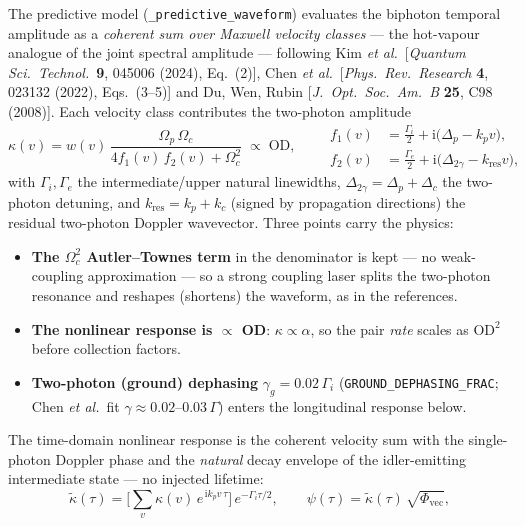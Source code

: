 \documentclass[11pt]{article}
\newcommand{\ii}{\mathrm{i}}
\newcommand{\code}[1]{\texttt{#1}}
\begin{document}
The predictive model (\code{\_predictive\_waveform}) evaluates the biphoton
temporal amplitude as a \emph{coherent sum over Maxwell velocity classes} --- the
hot-vapour analogue of the joint spectral amplitude --- following Kim
\emph{et al.}\ [\emph{Quantum Sci.\ Technol.}\ \textbf{9}, 045006 (2024),
Eq.~(2)], Chen \emph{et al.}\ [\emph{Phys.\ Rev.\ Research} \textbf{4}, 023132
(2022), Eqs.~(3--5)] and Du, Wen, Rubin [\emph{J.\ Opt.\ Soc.\ Am.\ B}
\textbf{25}, C98 (2008)]. Each velocity class contributes the two-photon
amplitude
\begin{equation}
\kappa(v)=w(v)\,
\frac{\Omega_p\,\Omega_c}
{4 f_1(v)\,f_2(v)+\Omega_c^2}\;\propto\;\mathrm{OD},
\qquad
\begin{aligned}
f_1(v)&=\tfrac{\Gamma_i}{2}+\ii\big(\Delta_p-k_p v\big),\\
f_2(v)&=\tfrac{\Gamma_e}{2}+\ii\big(\Delta_{2\gamma}-k_{\text{res}} v\big),
\end{aligned}
\label{eq:kappa}
\end{equation}
with $\Gamma_i,\Gamma_e$ the intermediate/upper natural linewidths,
$\Delta_{2\gamma}=\Delta_p+\Delta_c$ the two-photon detuning, and
$k_{\text{res}}=k_p+k_c$ (signed by propagation directions) the residual
two-photon Doppler wavevector. Three points carry the physics:
\begin{itemize}[leftmargin=1.6em]
  \item \textbf{The $\Omega_c^2$ Autler--Townes term} in the denominator is kept
  --- no weak-coupling approximation --- so a strong coupling laser splits the
  two-photon resonance and reshapes (shortens) the waveform, as in the
  references.
  \item \textbf{The nonlinear response is $\propto$ OD}: $\kappa\propto\alpha$,
  so the pair \emph{rate} scales as $\mathrm{OD}^2$ before collection factors.
  \item \textbf{Two-photon (ground) dephasing} $\gamma_g=0.02\,\Gamma_i$
  (\code{GROUND\_DEPHASING\_FRAC}; Chen \emph{et al.}\ fit
  $\gamma\approx0.02$--$0.03\,\Gamma$) enters the longitudinal response below.
\end{itemize}
The time-domain nonlinear response is the coherent velocity sum with the
single-photon Doppler phase and the \emph{natural} decay envelope of the
idler-emitting intermediate state --- no injected lifetime:
\begin{equation}
\tilde\kappa(\tau)=\Big[\sum_v \kappa(v)\,e^{\,\ii k_p v\,\tau}\Big]\,
e^{-\Gamma_i\tau/2},
\qquad
\psi(\tau)=\tilde\kappa(\tau)\,\sqrt{\Phi_{\text{vec}}},
\label{eq:predpsi}
\end{equation}
\end{document}
